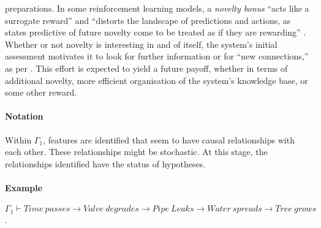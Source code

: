\begin{description}
   preparations.  In some reinforcement learning models, a
   \emph{novelty bonus} ``acts like a surrogate reward'' and ``distorts
   the landscape of predictions and actions, as states predictive of
   future novelty come to be treated as if they are rewarding''
   \cite[p.~554]{kakade2002dopamine}.  Whether or not novelty is
   interesting in and of itself, the system's initial assessment
   motivates it to look for further information or for ``new
   connections,'' as per \citet{Makri2012a}.  This effort is expected
   to yield a future payoff, whether in terms of additional novelty,
   more efficient organisation of the system's knowledge base, or some
   other reward.
 \end{description}

 \paragraph{\textbf{\upshape Notation}}

 Within $\Gamma_1$, features are identified that seem to have causal
 relationships with each other.  These relationships might be
 stochastic.  At this stage, the relationships identified have the
 status of hypotheses.

 \paragraph{\textbf{\upshape Example}}
  $\Gamma_1 \vdash \mathit{Time\ passes} \rightarrow
 \mathit{Valve\ degrades} \rightarrow \mathit{Pipe\ Leaks} \rightarrow \mathit{Water\ spreads} \rightarrow \mathit{Tree\ grows}$.


